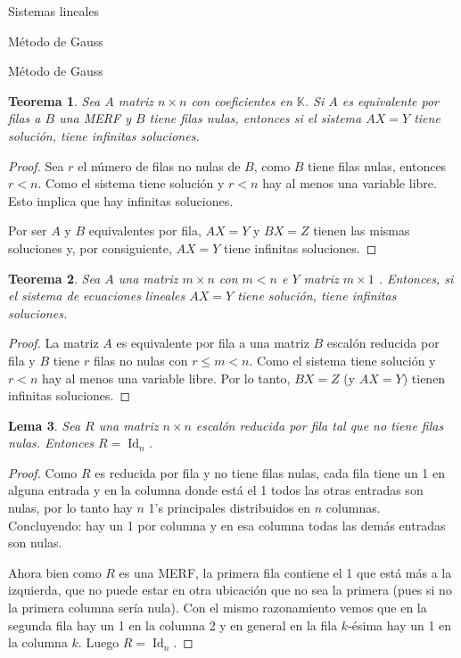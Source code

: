 \documentclass[a4paper,12pt,twoside,spanish,reqno]{amsbook}
\newtheorem{teorema}{Teorema}[section]
\newtheorem{lema}[teorema]{Lema}
\theoremstyle{definition}
\theoremstyle{remark}
\newcommand{\Id}{\operatorname{Id}}
\newcommand{\K}{\mathbb K}
\begin{document}
\begin{chapter}{Sistemas lineales}
\begin{section}{Método de Gauss }
\begin{subsection}{Método de Gauss}
				\begin{teorema}\label{inf-sol}
					Sea $A$ matriz $n \times n$ con coeficientes en $\K$. Si $A$ es equivalente por filas a  $B$ una  MERF y $B$ tiene filas nulas, entonces si el sistema $AX=Y$ tiene solución,  tiene infinitas soluciones. 
				\end{teorema}
				\begin{proof}
					Sea $r$  el número de filas no nulas de $B$, como $B$ tiene filas nulas,  entonces $r<n$. Como el sistema tiene solución y $r<n$  hay al menos una variable libre. Esto implica que hay infinitas soluciones. 
					
					Por ser $A$ y $B$ equivalentes por fila, $AX=Y$ y $BX=Z$ tienen las mismas soluciones y, por consiguiente, $AX=Y$ tiene infinitas soluciones. 
				\end{proof}
				
				\begin{teorema}\label{soluciones-m-menor-n}
					Sea $A$ una matriz $m \times n$ con  $m < n$ e $Y$ matriz $m \times 1$ . Entonces, si el sistema de ecuaciones lineales $AX=Y$ tiene solución, tiene infinitas soluciones.
				\end{teorema}
				\begin{proof}
					La matriz $A$ es equivalente por fila a una matriz $B$ escalón reducida por fila 
					y $B$ tiene $r$ filas no nulas con $r \le m <n$. Como el sistema tiene solución y $r<n$  hay al menos una variable libre. Por lo tanto, $BX=Z$ (y $AX=Y$) tienen infinitas soluciones.
				\end{proof}
				
				\begin{lema}\label{mtrx-merf-id}
					Sea $R$ una matriz $n \times n$ escalón reducida por fila tal que no tiene filas nulas. Entonces $R=\Id_n$. 
				\end{lema}
				\begin{proof}
					Como  $R$ es reducida por fila y no tiene filas nulas, cada fila tiene  un 1 en alguna entrada y en la columna donde está el 1 todos las otras entradas son nulas, por  lo tanto hay $n$ 1's principales distribuidos en $n$ columnas. Concluyendo: hay un 1 por columna y en esa columna todas las demás entradas son nulas. 
					
					Ahora bien como $R$ es una MERF, la primera fila contiene el 1 que está más a la izquierda, que no puede estar en otra ubicación que no sea la primera (pues si no la primera columna sería nula). Con el mismo razonamiento vemos que en la segunda fila hay un 1 en la columna 2 y en general en la fila $k$-ésima hay un 1 en la columna $k$. Luego $R=\Id_n$.
				\end{proof}			
				

\end{subsection}
\end{section}
\end{chapter}
\end{document}

